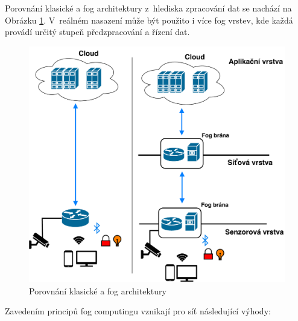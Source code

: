  Porovnání klasické a fog architektury z~hlediska zpracování dat se nachází
 na Obrázku \ref{obr.fog}. V~reálném nasazení může
 být použito i více fog vrstev, kde každá provádí určitý stupeň předzpracování a řízení
 dat.
\begin{figure}[ht]
\begin{center}
\includegraphics[scale=0.45]{pictures/fog-arch}
\caption{Porovnání klasické a fog architektury}
\label{obr.fog}
\end{center}
\end{figure}
 Zavedením principů fog computingu vznikají pro síť následující výhody:
